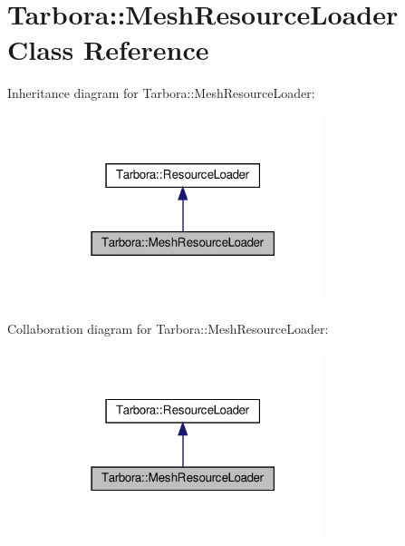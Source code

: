 \hypertarget{classTarbora_1_1MeshResourceLoader}{}\section{Tarbora\+:\+:Mesh\+Resource\+Loader Class Reference}
\label{classTarbora_1_1MeshResourceLoader}


Inheritance diagram for Tarbora\+:\+:Mesh\+Resource\+Loader\+:\nopagebreak
\begin{figure}[H]
\begin{center}
\leavevmode
\includegraphics[width=231pt]{classTarbora_1_1MeshResourceLoader__inherit__graph}
\end{center}
\end{figure}


Collaboration diagram for Tarbora\+:\+:Mesh\+Resource\+Loader\+:\nopagebreak
\begin{figure}[H]
\begin{center}
\leavevmode
\includegraphics[width=231pt]{classTarbora_1_1MeshResourceLoader__coll__graph}
\end{center}
\end{figure}
